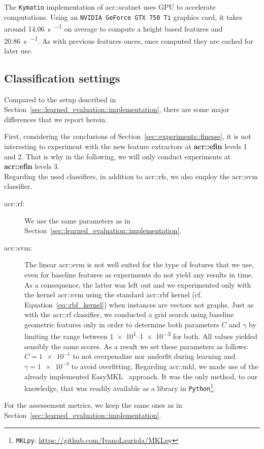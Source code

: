             The \verb!Kymatio! implementation of \gls{acr::scatnet} uses GPU to accelerate computations.
            Using an \verb!NVIDIA GeForce GTX 750 Ti! graphics card, it takes around \SI{14.06}{\s \per \building} on average to compute a height based features and \SI{20.86}{\s \per \building}.
            As with previous features onces, once computed they are cached for later use.

    \subsection{Classification settings}
        \label{sec::better_representation::implementation::classification}
        Compared to the setup described in Section~\ref{sec::learned_evaluation::implementation}, there are some major differences that we report herein.

        First, considering the conclusions of Section~\ref{sec::experiments::finesse}, it is not interesting to experiment with the new feature extractors at \textbf{\gls{acr::efin}} levels 1 and 2.
        That is why in the following, we will only conduct experiments at \textbf{\gls{acr::efin}} levels 3.\\

        Regarding the used classifiers, in addition to \glspl{acr::rf}, we also employ the \gls{acr::svm} classifier.
        \begin{description}
            \item[\gls{acr::rf}: ] We use the same parameters as in Section~\ref{sec::learned_evaluation::implementation}.
            \item[\gls{acr::svm}: ] The linear \gls{acr::svm} is not well suited for the type of features that we use, even for baseline features as experiments do not yield any results in time.
                As a consequence, the latter was left out and we experimented only with the kernel \gls{acr::svm} using the standard \gls{acr::rbf} kernel (cf. Equation~\ref{eq::rbf_kernel}) when instances are vectors not graphs.
                Just as with the \gls{acr::rf} classifier, we conducted a grid search using baseline geometric features only in order to determine both parameters \(C\) and \(\gamma\) by limiting the range between \numrange[range-phrase={ and }, scientific-notation = true]{1e1}{1e-3} for both.
                All values yielded sensibly the same scores.
                As a result we set these parameters as follows: \(C = \num[scientific-notation = true]{1e-1}\) to not overpenalize nor underfit during learning and \(\gamma = \num[scientific-notation = true]{1e-3}\) to avoid overfitting.
                Regarding \gls{acr::mkl}, we made use of the already implemented EasyMKL~\parencite{aiolli2015easymkl} approach.
                It was the only method, to our knowledge, that was readily available as a library in \verb!Python!\footnote{\verb!MKLpy!: \href{https://github.com/IvanoLauriola/MKLpy}{\url{https://github.com/IvanoLauriola/MKLpy}}}.
        \end{description}

        For the assessement metrics, we keep the same ones as in Section~\ref{sec::learned_evaluation::implementation}.
